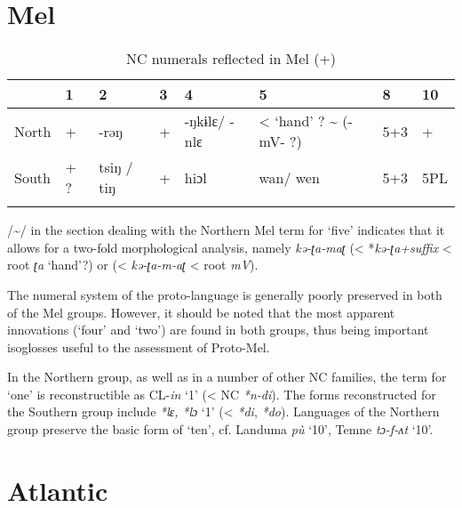 \clearpage
\section{Mel}%
 

\begin{table}
\caption{\label{tab:5:11} NC numerals reflected in Mel (+)} 
\begin{tabularx}{\textwidth}{llllllll} 
\lsptoprule
& {{1}} &  {{2}} & {{3}} & {{4}} & {5} & {8} & {{10}}\\
\midrule 
{{North}} & {{+}} & {-rəŋ} & {{+}} & {{-ŋkɨlɛ/ -nlɛ}} & {{<} {‘hand’} ? {{\textasciitilde} (-mV- ?)}} & {{5+3}} & {+}\\
{South} & {{+} ?} & {{tsiŋ} {/} {tiŋ}} & {{+}} & {{hiɔl}} & {wan/} {wen} & {5+3} & {{5PL}}\\
\lspbottomrule
\end{tabularx}
/{\textasciitilde}/ in the section dealing with the Northern Mel term for ‘five’ indicates that it allows for a two-fold morphological analysis, namely \textit{kə-ʈa-maʈ} (< *\textit{kə-ʈa+suffix} < root \textit{ʈa} ‘hand’?) or (< \textit{kə-ʈa-m-aʈ} < root \textit{mV}).
\end{table}

The numeral system of the proto-language is generally poorly preserved in both of the Mel groups. However, it should be noted that the most apparent innovations (‘four’ and ‘two’) are found in both groups, thus being important isoglosses useful to the assessment of Proto-Mel.

In the Northern group, as well as in a number of other NC families, the term for ‘one’ is reconstructible as CL-\textit{in} ‘1’ (< NC \textit{*n}\textit{-}\textit{di}). The forms reconstructed for the Southern group include \textit{*l}\textit{ɛ,} \textit{*l}\textit{ɔ} ‘1’ (< \textit{*di}, \textit{*do}). Languages of the Northern group preserve the basic form of ‘ten’, cf. Landuma  \textit{p{\`{u}}} ‘10’, Temne \textit{tɔ-f-ʌt} ‘10’.

\clearpage
\section{Atlantic}%
 
